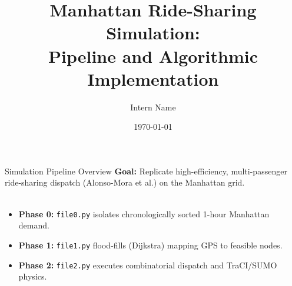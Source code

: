 \documentclass{beamer}
\title[Manhattan Ride-Sharing Simulation]{Manhattan Ride-Sharing Simulation:\\ Pipeline and Algorithmic Implementation}
\author[Intern Name]{Intern Name}
\institute[University/Lab]{University/Lab}
\date{\today}
\begin{document}
\begin{frame}
  \titlepage
\end{frame}

\begin{frame}{Simulation Pipeline Overview}
  \textbf{Goal:} Replicate high-efficiency, multi-passenger ride-sharing dispatch (Alonso-Mora et al.) on the Manhattan grid. \\~\\
  
  \begin{center}
  \end{center}
  \vspace{0.3cm}
  \begin{itemize}
      \item \textbf{Phase 0:} \texttt{file0.py} isolates chronologically sorted 1-hour Manhattan demand.
      \item \textbf{Phase 1:} \texttt{file1.py} flood-fills (Dijkstra) mapping GPS to feasible nodes.
      \item \textbf{Phase 2:} \texttt{file2.py} executes combinatorial dispatch and TraCI/SUMO physics.
  \end{itemize}
\end{frame}
\end{document}
